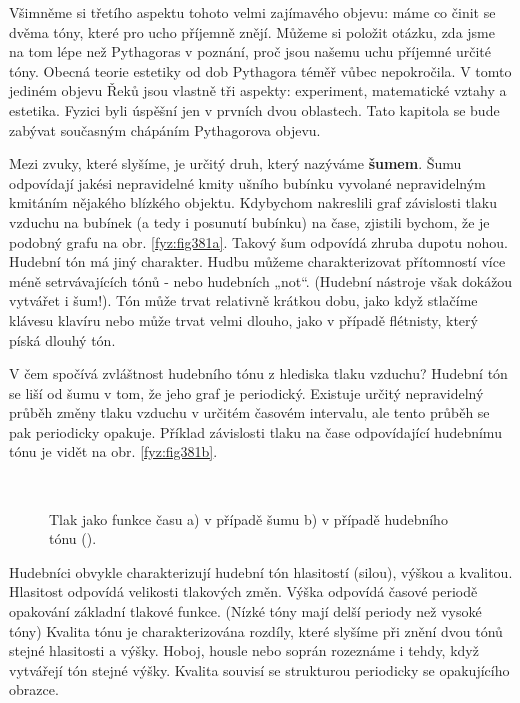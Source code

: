   Všimněme si třetího aspektu tohoto velmi zajímavého objevu: máme co činit se dvěma tóny, které 
  pro ucho příjemně znějí. Můžeme si položit otázku, zda jsme na tom lépe než Pythagoras v 
  poznání, proč jsou našemu uchu příjemné určité tóny. Obecná teorie estetiky od dob Pythagora 
  téměř vůbec nepokročila. V tomto jediném objevu Řeků jsou vlastně tři aspekty: experiment, 
  matematické vztahy a estetika. Fyzici byli úspěšní jen v prvních dvou oblastech. Tato kapitola 
  se bude zabývat současným chápáním Pythagorova objevu. 
    
  Mezi zvuky, které slyšíme, je určitý druh, který nazýváme \textbf{šumem}. Šumu odpovídají 
  jakési nepravidelné kmity ušního bubínku vyvolané nepravidelným kmitáním nějakého blízkého 
  objektu. Kdybychom nakreslili graf závislosti tlaku vzduchu na bubínek (a tedy i posunutí 
  bubínku) na čase, zjistili bychom, že je podobný grafu na obr. \ref{fyz:fig381a}. Takový šum 
  odpovídá zhruba dupotu nohou. Hudební tón má jiný charakter. Hudbu můžeme charakterizovat 
  přítomností více méně setrvávajících tónů - nebo hudebních „not“. (Hudební nástroje však dokážou 
  vytvářet i šum!). Tón může trvat relativně krátkou dobu, jako když stlačíme klávesu klavíru nebo 
  může trvat velmi dlouho, jako v případě flétnisty, který píská dlouhý tón. 
    
  V čem spočívá zvláštnost hudebního tónu z hlediska tlaku vzduchu? Hudební tón se liší od šumu v 
  tom, že jeho graf je periodický. Existuje určitý nepravidelný průběh změny tlaku vzduchu v 
  určitém časovém intervalu, ale tento průběh se pak periodicky opakuje. Příklad závislosti tlaku 
  na čase odpovídající hudebnímu tónu je vidět na obr. \ref{fyz:fig381b}.

  \begin{figure}[ht!] %
    \centering
     \\
    \caption{Tlak jako funkce času a) v případě šumu b) v případě hudebního tónu
             (\cite[s.~673]{Feynman01}).}
    \label{fyz:fig381}
  \end{figure}
  
  Hudebníci obvykle charakterizují hudební tón hlasitostí (silou), výškou a kvalitou. Hlasitost 
  odpovídá velikosti tlakových změn. Výška odpovídá časové periodě opakování základní tlakové 
  funkce. (Nízké tóny mají delší periody než vysoké tóny) Kvalita tónu je charakterizována rozdíly, 
  které slyšíme při znění dvou tónů stejné hlasitosti a výšky. Hoboj, housle nebo soprán rozeznáme 
  i tehdy, když vytvářejí tón stejné výšky. Kvalita souvisí se strukturou periodicky se opakujícího 
  obrazce.
  
